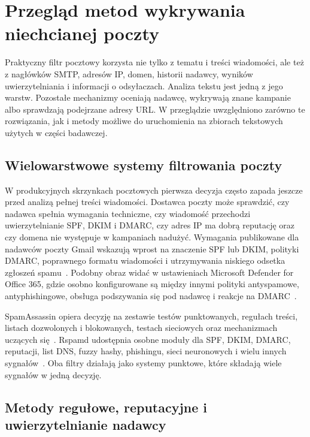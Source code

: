 \chapter{Przegląd metod wykrywania niechcianej poczty}

Praktyczny filtr pocztowy korzysta nie tylko z tematu i treści wiadomości, ale
też z nagłówków SMTP, adresów IP, domen, historii nadawcy, wyników
uwierzytelniania i informacji o odsyłaczach. Analiza tekstu jest jedną z jego
warstw. Pozostałe mechanizmy oceniają nadawcę, wykrywają znane kampanie albo
sprawdzają podejrzane adresy URL. W przeglądzie uwzględniono zarówno te
rozwiązania, jak i metody możliwe do uruchomienia na zbiorach tekstowych użytych
w części badawczej.

\section{Wielowarstwowe systemy filtrowania poczty}

W produkcyjnych skrzynkach pocztowych pierwsza decyzja często zapada jeszcze przed
analizą pełnej treści wiadomości. Dostawca poczty może sprawdzić, czy nadawca
spełnia wymagania techniczne, czy wiadomość przechodzi uwierzytelnianie SPF,
DKIM i DMARC, czy adres IP ma dobrą reputację oraz czy domena nie występuje w
kampaniach nadużyć. Wymagania publikowane dla nadawców poczty Gmail wskazują
wprost na znaczenie SPF lub DKIM, polityki DMARC, poprawnego formatu wiadomości
i utrzymywania niskiego odsetka zgłoszeń spamu~\autocite{gmail-sender-guidelines}.
Podobny obraz widać w ustawieniach Microsoft Defender for Office 365, gdzie
osobno konfigurowane są między innymi polityki antyspamowe, antyphishingowe,
obsługa podszywania się pod nadawcę i reakcje na DMARC~\autocite{microsoft-defender-o365-security-settings}.

SpamAssassin opiera decyzję na zestawie testów punktowanych, regułach
treści, listach dozwolonych i blokowanych, testach sieciowych oraz mechanizmach
uczących się~\autocite{spamassassin-conf}. Rspamd udostępnia osobne moduły dla
SPF, DKIM, DMARC, reputacji, list DNS, fuzzy hashy, phishingu, sieci neuronowych
i wielu innych sygnałów~\autocite{rspamd-modules}. Oba filtry działają jako
systemy punktowe, które składają wiele sygnałów w jedną decyzję.

\section{Metody regułowe, reputacyjne i uwierzytelnianie nadawcy}

